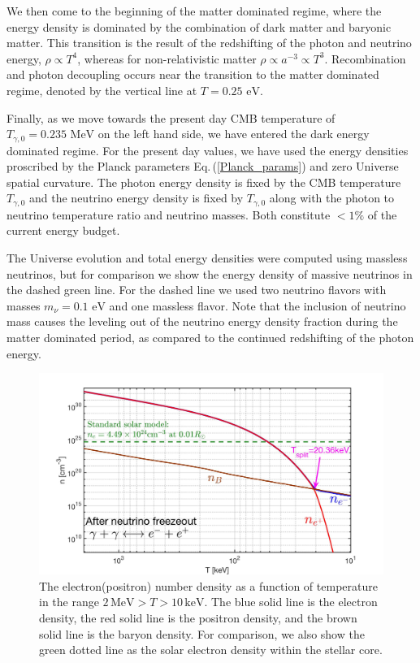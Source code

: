 \documentclass[universe,article,submit,moreauthors,pdftex,a4paper]{Definitions/mdpi}
\newcommand{\MeV}{\text{ MeV}}
\newcommand{\eV}{\text{ eV}}
\newcommand{\req}[1]{Eq.\,(\ref{#1})}
\begin{document}
 We then come to the beginning of the matter dominated regime, where the energy density is dominated by the combination of dark matter and baryonic matter.  This transition is the result of the redshifting of the photon and neutrino energy, $\rho\propto T^4$, whereas for non-relativistic matter $\rho\propto a^{-3}\propto T^3$.  Recombination and photon decoupling occurs near the transition to the matter dominated regime, denoted by the vertical line at $T=0.25\eV$.

Finally, as we move towards the present day CMB temperature of $T_{\gamma,0}=0.235\MeV$  on the left hand side, we have entered the dark energy dominated regime.  For the present day values, we have used the energy densities proscribed by the Planck parameters \req{Planck_params} \cite{Planck:2013pxb} and zero Universe spatial curvature.  The photon energy density is fixed by the CMB temperature $T_{\gamma,0}$ and the neutrino energy density is fixed by $T_{\gamma,0}$ along with the photon to neutrino temperature ratio and neutrino masses.  Both constitute $<1\%$ of the current energy budget.

The Universe evolution and total energy densities were computed using massless neutrinos, but  for comparison we show the energy density of massive neutrinos in the dashed green line. For the dashed line we used two neutrino flavors with masses $m_\nu=0.1\eV$ and one massless flavor.  Note that the inclusion of neutrino mass causes the leveling out of the neutrino energy density fraction during the matter dominated period, as compared to the continued redshifting of the photon energy.

\begin{figure}[h]
  \centering
  \includegraphics[width=\linewidth]{./plots/NewDensity_cm3.jpg}
  \caption{The electron(positron) number density as a function of temperature in the range $2\,\mathrm{MeV}>T>10\,\mathrm{keV}$. The blue solid line is the electron density, the red solid line is the positron density, and the brown solid line is the baryon density. For comparison, we also show the green dotted line as the solar electron density within the stellar core.}
  \label{Density_fig} 
\end{figure}
\end{document}
